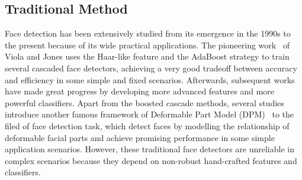 \documentclass{article} \usepackage{nips13submit_e,times}
\begin{document}
\subsection{Traditional Method}
Face detection has been extensively studied from its emergence in the 1990s to the present because of its wide practical applications. The pioneering work~\cite{DBLP:journals/ijcv/ViolaJ04} of Viola and Jones uses the Haar-like feature and the AdaBoost strategy to train several cascaded face detectors, achieving a very good tradeoff between accuracy and efficiency in some simple and fixed scenarios. Afterwards, subsequent works~\cite{DBLP:journals/ijcv/BrubakerWSMR08,DBLP:journals/pami/LiaoJL16} have made great progress by developing more advanced features and more powerful classifiers. Apart from the boosted cascade methods, several studies~\cite{DBLP:conf/cvpr/YanLWL14,DBLP:conf/cvpr/ZhuR12,DBLP:conf/icb/YangYLL14} introduce another famous framework of Deformable Part Model (DPM)~\cite{DBLP:conf/eccv/MathiasBPG14} to the filed of face detection task, which detect faces by modelling the relationship of deformable facial parts and achieve promising performance in some simple application scenarios. However, these traditional face detectors are unreliable in complex scenarios because they depend on non-robust hand-crafted features and classifiers.
\end{document}
